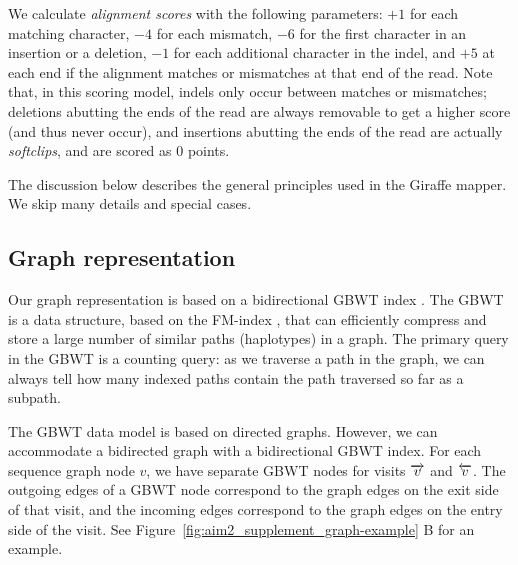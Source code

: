 \documentclass[11pt]{ucscthesis}
\newcommand{\forwardnode}[1]{\ensuremath{\protect\overrightarrow{ #1 }}}
\newcommand{\reversenode}[1]{\ensuremath{\protect\overleftarrow{ #1 }}}
\newcommand{\vocab}[1]{\emph{#1}}
\begin{document}
We calculate \vocab{alignment scores} with the following parameters: $+1$ for each matching character, $-4$ for each mismatch, $-6$ for the first character in an insertion or a deletion, $-1$ for each additional character in the indel, and $+5$ at each end if the alignment matches or mismatches at that end of the read.
Note that, in this scoring model, indels only occur between matches or mismatches; deletions abutting the ends of the read are always removable to get a higher score (and thus never occur), and insertions abutting the ends of the read are actually \vocab{softclips}, and are scored as 0 points.

The discussion below describes the general principles used in the Giraffe mapper.
We skip many details and special cases.



\subsection{Graph representation}

Our graph representation is based on a bidirectional GBWT index \cite{siren_indexes_2020}.
The GBWT is a data structure, based on the FM-index \cite{Ferragina2005a}, that can efficiently compress and store a large number of similar paths (haplotypes) in a graph.
The primary query in the GBWT is a counting query: as we traverse a path in the graph, we can always tell how many indexed paths contain the path traversed so far as a subpath.

The GBWT data model is based on directed graphs.
However, we can accommodate a bidirected graph with a bidirectional GBWT index.
For each sequence graph node $v$, we have separate GBWT nodes for visits $\forwardnode{v}$ and $\reversenode{v}$.
The outgoing edges of a GBWT node correspond to the graph edges on the exit side of that visit, and the incoming edges correspond to the graph edges on the entry side of the visit.
See Figure~\ref{fig:aim2_supplement_graph-example} B for an example.
\end{document}
